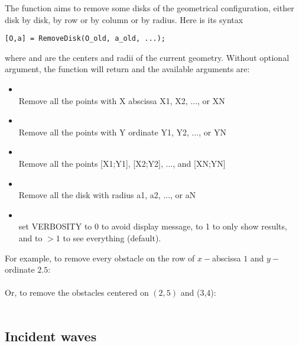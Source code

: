 The function  aims to remove some disks of the geometrical configuration, either disk by disk, by row or by column or by radius. Here is its syntax
\begin{verbatim}
[O,a] = RemoveDisk(O_old, a_old, ...);
\end{verbatim}
where  and  are the centers and radii of the current geometry. Without optional argument, the function will return  and the available arguments are:
\begin{itemize}
\item {}\\
Remove all the points with X abscissa X1, X2, ..., or XN
\item {}\\
Remove all the points with Y ordinate Y1, Y2, ..., or YN
\item {}\\
Remove all the points [X1;Y1], [X2;Y2], ..., and [XN;YN]
\item {}\\
Remove all the disk with radius a1, a2, ..., or aN
\item {}\\
set VERBOSITY to 0 to avoid display message, to 1 to only show results, and to $>1$ to see everything (default).
\end{itemize}

For example, to remove every obstacle on the row of $x-$abscissa $1$ and $y-$ordinate $2.5$:\\
\\
Or, to remove the obstacles centered on $(2,5)$ and (3,4):\\
\\

\subsection{Incident waves}

